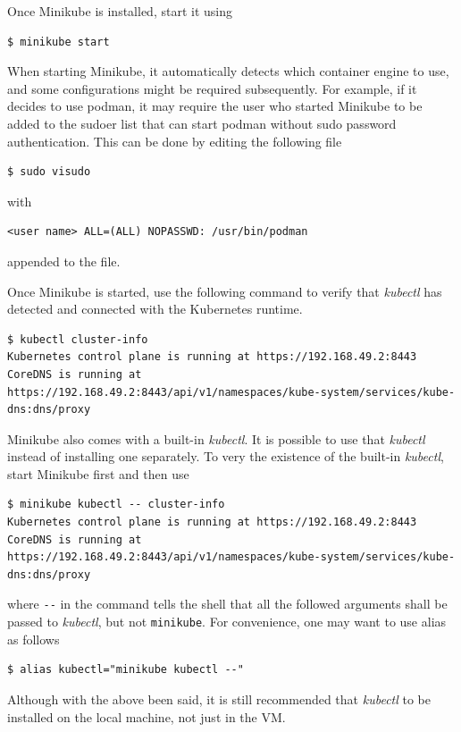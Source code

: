 Once Minikube is installed, start it using
\begin{lstlisting}
$ minikube start
\end{lstlisting}
When starting Minikube, it automatically detects which container engine to use, and some configurations might be required subsequently. For example, if it decides to use podman, it may require the user who started Minikube to be added to the sudoer list that can start podman without sudo password authentication. This can be done by editing the following file
\begin{lstlisting}
$ sudo visudo
\end{lstlisting}
with
\begin{lstlisting}
<user name> ALL=(ALL) NOPASSWD: /usr/bin/podman
\end{lstlisting}
appended to the file.

Once Minikube is started, use the following command to verify that \textit{kubectl} has detected and connected with the Kubernetes runtime.
\begin{lstlisting}
$ kubectl cluster-info
Kubernetes control plane is running at https://192.168.49.2:8443
CoreDNS is running at https://192.168.49.2:8443/api/v1/namespaces/kube-system/services/kube-dns:dns/proxy
\end{lstlisting}

\begin{shortbox}

Minikube also comes with a built-in \textit{kubectl}. It is possible to use that \textit{kubectl} instead of installing one separately. To very the existence of the built-in \textit{kubectl}, start Minikube first and then use

\begin{lstlisting}
$ minikube kubectl -- cluster-info
Kubernetes control plane is running at https://192.168.49.2:8443
CoreDNS is running at https://192.168.49.2:8443/api/v1/namespaces/kube-system/services/kube-dns:dns/proxy
\end{lstlisting}
where \verb|--| in the command tells the shell that all the followed arguments shall be passed to \textit{kubectl}, but not \verb|minikube|. For convenience, one may want to use alias as follows
\begin{lstlisting}
$ alias kubectl="minikube kubectl --"
\end{lstlisting}

Although with the above been said, it is still recommended that \textit{kubectl} to be installed on the local machine, not just in the VM. 
\end{shortbox}

